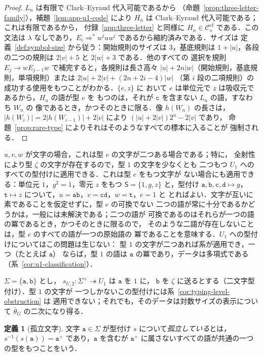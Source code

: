 \documentclass[11pt,a4paper]{ltjsarticle}
\numberwithin{equation}{section}
\theoremstyle{plain}
\theoremstyle{definition}
\newtheorem{definition}[theorem]{定義}
\theoremstyle{remark}
\theoremstyle{plain}
\newcommand{\cf}{\mathrm{cf}}
\newcommand{\Ccf}[1]{\mathcal C_{#1}^{\cf}}
\begin{document}
\begin{proof}
$L_n$ は有限で Clark--Eyraud 代入可能であるから
（命題~\ref{prop:three-letter-family}），補題~\ref{lem:app-u1-code} により
$H_n$ は Clark--Eyraud 代入可能である；これは有限であるから，
付録~\ref{app:three-letter} と同様に $H_n\in\Ccf{s}$ である．この文法は
$\lambda$ なしであり，$E_i\Rightarrow^*w^iuw^i$ であるから縮約済みである．サイズは
定義~\ref{def:symbol-size} から従う：開始規則のサイズは $3$，基底規則は
$1+|u|$，各段の二つの規則は $2|v|+5$ と $2|w|+3$ である．他のすべての
選択を規則 $E_j\to wE_{j-1}w$ で補完すると，各規則は長さ高々
$|u|+2n|w|$（開始規則，基底規則，単項規則）または $2|u|+2|v|+(2n+2i-4)|w|$
（第 $i$ 段の二項規則）の成功する使用をもつことがわかる．$\{e,z\}$ に
おいて $e$ は単位元で $z$ は吸収元であるから，$H_n$ の語が型 $e$ を
もつのは，それが $\mathtt c$ を含まない $L_n$ の語，すなわち $W_n$ の
像であるとき，かつそのときに限る．像 $h(W_n)$ の長さは，
$|h(W_i)|=2|h(W_{i-1})|+2|v|$ により $(|u|+2|v|)2^n-2|v|$ であり，
命題~\ref{prop:rare-type} によりそれはそのようなすべての標本に入ることが
強制される．
\end{proof}

$u,v,w$ が文字の場合，これは型 $e$ の文字が二つある場合である；特に，
全射性により型 $\zeta$ の文字が存在するので，型 $1$ の文字を少なくとも
二つもつ $U_1$ へのすべての型付けに適用できる．これは型 $e$ をもつ文字が
ない場合にも適用できる：単位元 $1$，$g^2=1$，零元 $z$ をもつ
$\mathsf S=\{1,g,z\}$ と，型付け
$\mathtt a,\mathtt b,\mathtt c,\mathtt d\mapsto g$，$\mathtt t\mapsto z$
について，$u=\mathtt{ab}$，$v=\mathtt{cd}$，$w=\mathtt t$，$e=1$ と
とればよい．文字が互いに素であることを仮定せずに，型 $e$ の可換でない
二つの語が常に十分であるかどうかは，一般には未解決である；二つの語が
可換であるのはそれらが一つの語の冪であるとき，かつそのときに限るので，
そのような二語が存在しないことは，型 $e$ のすべての語が一つの原始語の
冪であることを意味する．$U_1$ への型付けについてはこの問題は生じない：
型 $1$ の文字が二つあれば系が適用でき，一つ（たとえば $\mathtt a$）
ならば，型 $1$ の語は $\mathtt a$ の冪であり，データは多項式である
（系~\ref{cor:u1-classification}）．

$\Sigma=\{\mathtt a,\mathtt b\}$ とし，
$s_{U,2}:\Sigma^+\twoheadrightarrow U_1$ は $\mathtt a$ を $1$ に，
$\mathtt b$ を $\zeta$ に送るとする（二文字型付け）．型 $1$ の文字が
一つしかないこの型付けには系~\ref{cor:typing-level-obstruction} は
適用できない；それでも，そのデータは対数サイズの表示について
$\bar\theta_G$ の二次になり得る．

\begin{definition}[孤立文字]
\label{def:isolated-letter}
文字 $\mathtt a\in\Sigma$ が型付け $s$ について\emph{孤立している}とは，
$s^{-1}(s(\mathtt a))=\mathtt a^+$ であり，$\mathtt a$ を含むが
$\mathtt a^+$ に属さないすべての語が共通の一つの型をもつことをいう．
\end{definition}
\end{document}
